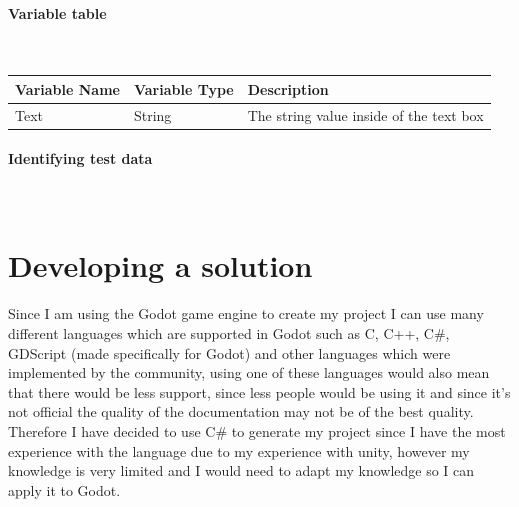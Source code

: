 \documentclass{article}
\newcommand{\myparagraph}[1]{\paragraph{#1}\mbox{}\\} %
\newcommand{\smallBr}{\vspace{1.5mm}}
\begin{document}
\myparagraph{Variable table}
\smallBr
\begin{table}[H]
\begin{tabular}{l|l|l}
\textbf{Variable Name} & \textbf{Variable Type} & \textbf{Description}                    \\ \hline
Text                   & String                 & The string value inside of the text box
\end{tabular}%
\end{table}

\myparagraph{Identifying test data}
\smallBr
\begin{table}[H]
\end{table}

\section{Developing a solution}
Since I am using the Godot game engine to create my project I can use many different languages which are supported in Godot such as C, C++, C\#, GDScript (made specifically for Godot) and other languages which were implemented by the community, using one of these languages would also mean that there would be less support, since less people would be using it and since it's not official the quality of the documentation may not be of the best quality. Therefore I have decided to use C\# to generate my project since I have the most experience with the language due to my experience with unity, however my knowledge is very limited and I would need to adapt my knowledge so I can apply it to Godot. 
\end{document}
